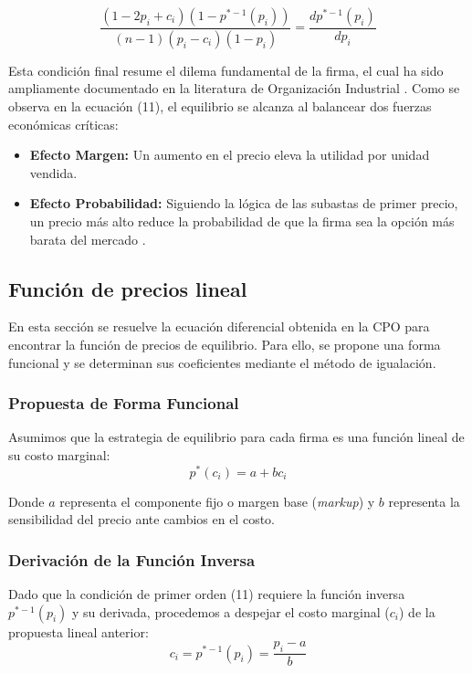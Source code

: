 \documentclass[12pt]{article}
\begin{document}
\begin{equation}
    \frac{(1 - 2p_i + c_i)(1 - p^{*-1}(p_i))}{(n - 1)(p_i - c_i)(1 - p_i)} = \frac{d p^{*-1}(p_i)}{d p_i}
\end{equation}

\noindent Esta condición final resume el dilema fundamental de la firma, el cual ha sido ampliamente documentado en la literatura de Organización Industrial \cite{tirole1988}. Como se observa en la ecuación (11), el equilibrio se alcanza al balancear dos fuerzas económicas críticas:

\begin{itemize}
    \item \textbf{Efecto Margen:} Un aumento en el precio eleva la utilidad por unidad vendida.
    \item \textbf{Efecto Probabilidad:} Siguiendo la lógica de las subastas de primer precio, un precio más alto reduce la probabilidad de que la firma sea la opción más barata del mercado \cite{klemperer1999}.
\end{itemize}

\subsection{Función de precios lineal} 
En esta sección se resuelve la ecuación diferencial obtenida en la CPO para encontrar la función de precios de equilibrio. Para ello, se propone una forma funcional y se determinan sus coeficientes mediante el método de igualación.

\subsubsection{Propuesta de Forma Funcional}
Asumimos que la estrategia de equilibrio para cada firma es una función lineal de su costo marginal:
\begin{equation}
    p^*(c_i) = a + b c_i
\end{equation}

Donde $a$ representa el componente fijo o margen base (\textit{markup}) y $b$ representa la sensibilidad del precio ante cambios en el costo.

\subsubsection{Derivación de la Función Inversa}
Dado que la condición de primer orden (11) requiere la función inversa $p^{*-1}(p_i)$ y su derivada, procedemos a despejar el costo marginal ($c_i$) de la propuesta lineal anterior:
\begin{equation}
    c_i = p^{*-1}(p_i) = \frac{p_i - a}{b}
\end{equation}
\end{document}
